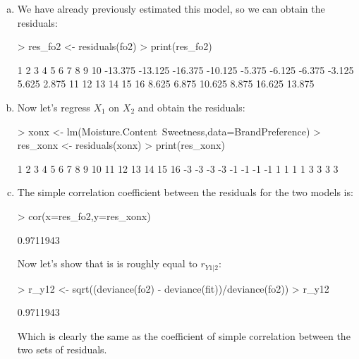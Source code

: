 \documentclass{article}
\begin{document}
\begin{enumerate}[a)]
\item{} We have already previously estimated this model, so we can obtain the residuals:

\begin{Schunk}
\begin{Sinput}
> res_fo2 <- residuals(fo2)
> print(res_fo2)
\end{Sinput}
\begin{Soutput}
      1       2       3       4       5       6       7       8       9      10 
-13.375 -13.125 -16.375 -10.125  -5.375  -6.125  -6.375  -3.125   5.625   2.875 
     11      12      13      14      15      16 
  8.625   6.875  10.625   8.875  16.625  13.875 
\end{Soutput}
\end{Schunk}

\item{} Now let's regress $X_1$ on $X_2$ and obtain the residuals:

\begin{Schunk}
\begin{Sinput}
> xonx <- lm(Moisture.Content~Sweetness,data=BrandPreference)
> res_xonx <- residuals(xonx)
> print(res_xonx)
\end{Sinput}
\begin{Soutput}
 1  2  3  4  5  6  7  8  9 10 11 12 13 14 15 16 
-3 -3 -3 -3 -1 -1 -1 -1  1  1  1  1  3  3  3  3 
\end{Soutput}
\end{Schunk}

\item{} The simple correlation coefficient between the residuals for the two models is:

\begin{Schunk}
\begin{Sinput}
> cor(x=res_fo2,y=res_xonx)
\end{Sinput}
\begin{Soutput}
[1] 0.9711943
\end{Soutput}
\end{Schunk}

Now let's show that is is roughly equal to $r_{Y1|2}$:

\begin{Schunk}
\begin{Sinput}
> r_y12 <- sqrt((deviance(fo2) - deviance(fit))/deviance(fo2))
> r_y12
\end{Sinput}
\begin{Soutput}
[1] 0.9711943
\end{Soutput}
\end{Schunk}

Which is clearly the same as the coefficient of simple correlation between the two sets of residuals.

\end{enumerate}
\end{document}
